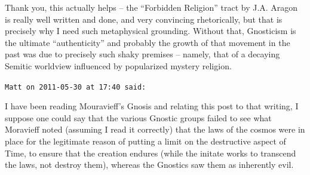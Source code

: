 \begin{footnotesize}
\begin{sffamily}
Thank you, this actually helps -- the ``Forbidden Religion'' tract by J.A. Aragon is really well written and done, and very convincing rhetorically, but that is precisely why I need such metaphysical grounding. Without that, Gnosticism is the ultimate ``authenticity'' and probably the growth of that movement in the past was due to precisely such shaky premises -- namely, that of a decaying Semitic worldview influenced by popularized mystery religion.

\hfill

\texttt{Matt on 2011-05-30 at 17:40 said:}

I have been reading Mouravieff's Gnosis and relating this post to that writing, I suppose one could say that the various Gnostic groups failed to see what Moravieff noted (assuming I read it correctly) that the laws of the cosmos were in place for the legitimate reason of putting a limit on the destructive aspect of Time, to ensure that the creation endures (while the initate works to transcend the laws, not destroy them), whereas the Gnostics saw them as inherently evil.

\hfill

\end{sffamily}
\end{footnotesize}

